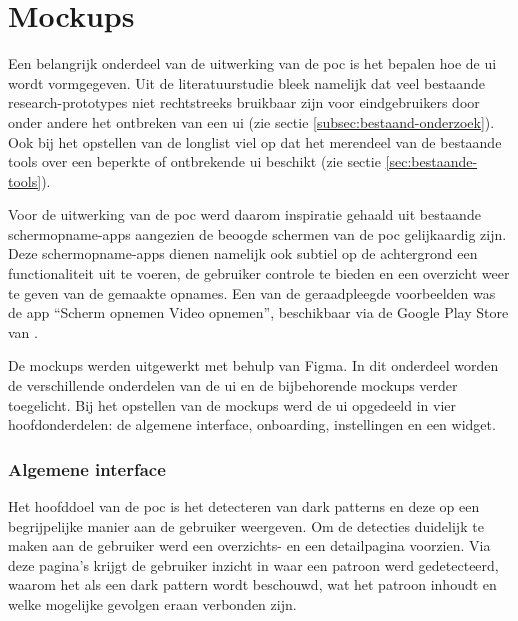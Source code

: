 \newpage

\section{Mockups}
\label{sec:mockups}

\vspace{1em}

Een belangrijk onderdeel van de uitwerking van de \acrshort{poc} is het bepalen hoe de \acrlong{ui} wordt vormgegeven. Uit de literatuurstudie bleek namelijk dat veel bestaande research-prototypes niet rechtstreeks bruikbaar zijn voor eindgebruikers door onder andere het ontbreken van een \acrshort{ui} (zie sectie \ref{subsec:bestaand-onderzoek}). Ook bij het opstellen van de longlist viel op dat het merendeel van de bestaande tools over een beperkte of ontbrekende \acrshort{ui} beschikt (zie sectie \ref{sec:bestaande-tools}).

\vspace{1em}

Voor de uitwerking van de \acrlong{poc} werd daarom inspiratie gehaald uit bestaande schermopname-apps aangezien de beoogde schermen van de \acrshort{poc} gelijkaardig zijn. Deze schermopname-apps dienen namelijk ook subtiel op de achtergrond een functionaliteit uit te voeren, de gebruiker controle te bieden en een overzicht weer te geven van de gemaakte opnames. Een van de geraadpleegde voorbeelden was de app ``Scherm opnemen Video opnemen'', beschikbaar via de Google Play Store van \textcite{VPCT2026}.

\vspace{1em}

De mockups werden uitgewerkt met behulp van Figma. In dit onderdeel worden de verschillende onderdelen van de \acrshort{ui} en de bijbehorende mockups verder toegelicht. Bij het opstellen van de mockups werd de \acrshort{ui} opgedeeld in vier hoofdonderdelen: de algemene interface, onboarding, instellingen en een widget.

\vspace{1em}

\subsubsection{Algemene interface}

\vspace{1em}

Het hoofddoel van de \acrshort{poc} is het detecteren van dark patterns en deze op een begrijpelijke manier aan de gebruiker weergeven. Om de detecties duidelijk te maken aan de gebruiker werd een overzichts- en een detailpagina voorzien. Via deze pagina's krijgt de gebruiker inzicht in waar een patroon werd gedetecteerd, waarom het als een dark pattern wordt beschouwd, wat het patroon inhoudt en welke mogelijke gevolgen eraan verbonden zijn.

